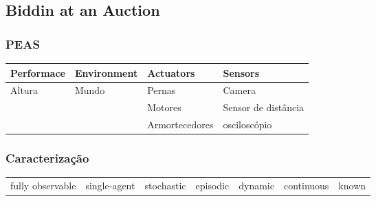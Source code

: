 \documentclass[a4paper,12pt]{article}
\begin{document}
\subsection{Biddin at an Auction}
\subsubsection{PEAS}
\begin{table}[h!]
\begin{tabular}{l|l|l|l}
\hline
Performace & Environment & Actuators & Sensors \\
\hline
Altura & Mundo & Pernas & Camera \\
 & & Motores & Sensor de distância\\
 & & Armortecedores & osciloscópio\\
\end{tabular}
\end{table}
\subsubsection{Caracterização}
\begin{table}[h!]
\begin{tabular}{|c|c|c|c|c|c|c|}
\hline
fully observable & single-agent & stochastic & episodic & dynamic & continuous & known
\end{tabular}
\end{table}
\end{document}

